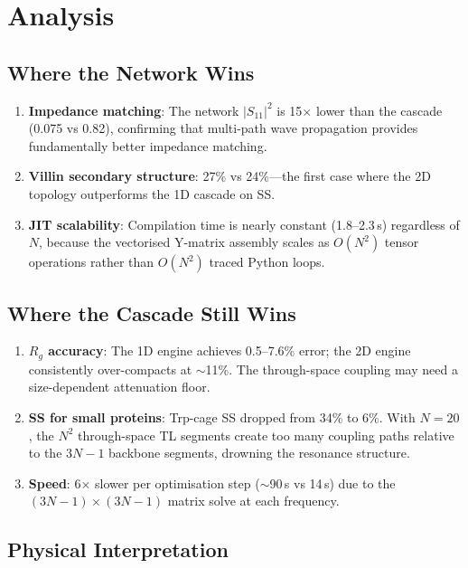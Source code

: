 \section{Analysis}
\label{sec:2d_analysis}

\subsection{Where the Network Wins}
\begin{enumerate}
    \item \textbf{Impedance matching}: The network $|S_{11}|^2$ is 15$\times$ lower than the cascade (0.075 vs 0.82), confirming that multi-path wave propagation provides fundamentally better impedance matching.
    \item \textbf{Villin secondary structure}: 27\% vs 24\%---the first case where the 2D topology outperforms the 1D cascade on SS.
    \item \textbf{JIT scalability}: Compilation time is nearly constant (1.8--2.3\,s) regardless of $N$, because the vectorised Y-matrix assembly scales as $O(N^2)$ tensor operations rather than $O(N^2)$ traced Python loops.
\end{enumerate}

\subsection{Where the Cascade Still Wins}
\begin{enumerate}
    \item \textbf{$R_g$ accuracy}: The 1D engine achieves 0.5--7.6\% error; the 2D engine consistently over-compacts at $\sim$11\%.
    The through-space coupling may need a size-dependent attenuation floor.
    \item \textbf{SS for small proteins}: Trp-cage SS dropped from 34\% to 6\%.
    With $N=20$, the $N^2$ through-space TL segments create too many coupling paths relative to the $3N-1$ backbone segments, drowning the resonance structure.
    \item \textbf{Speed}: 6$\times$ slower per optimisation step ($\sim$90\,s vs 14\,s) due to the $(3N-1) \times (3N-1)$ matrix solve at each frequency.
\end{enumerate}

\subsection{Physical Interpretation}

